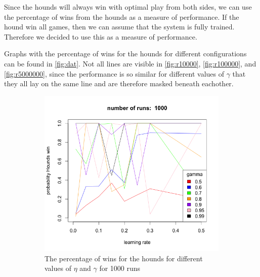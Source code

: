 Since the hounds will always win with optimal play from both sides, we can
use the percentage of wins from the hounds as a measure of performance. If
the hound win all games, then we can assume that the system is fully
trained. Therefore we decided to use this as a measure of performance. 

Graphs with the percentage of wins for the hounds for different
configurations can be found in \autoref{fig:dat}. Not all lines are visible
in \autoref{fig:r10000}, \autoref{fig:r100000}, and \autoref{fig:r5000000},
since the performance is so similar for different values of $\gamma$ that
they all lay on the same line and are therefore masked beneath eachother.

\begin{figure}[bt]
    \centering
    \begin{subfigure}{0.49\textwidth}
        \includegraphics[width=\textwidth]{r1000}
        \caption{The percentage of wins for the hounds for different values
            of $\eta$ and $\gamma$ for 1000 runs}
        \label{fig:r1000}
    \end{subfigure}
    ~
    \begin{subfigure}{0.49\textwidth}

\end{subfigure}
\end{figure}
